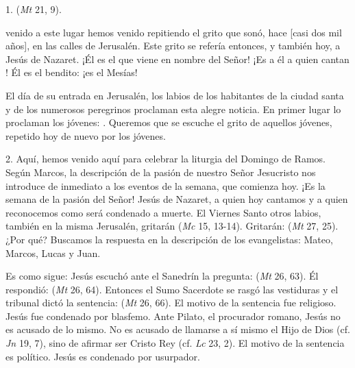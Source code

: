 \begin{body}
1.  (\textit{Mt} 21, 9).

 venido a este lugar  hemos venido repitiendo el grito que sonó, hace [casi dos mil años], en las calles de Jerusalén. Este grito se refería entonces, y también hoy, a Jesús de Nazaret. ¡Él es el que viene en nombre del Señor! ¡Es a él a quien cantan ! Él es el bendito: ¡es el Mesías!

El día de su entrada en Jerusalén, los labios de los habitantes de la ciudad santa y de los numerosos peregrinos proclaman esta alegre noticia. En primer lugar lo proclaman los jóvenes: . Queremos que se escuche el grito de aquellos jóvenes, repetido hoy de nuevo por los jóvenes. 

2. Aquí, hemos venido aquí para celebrar la liturgia del Domingo de Ramos. Según Marcos, la descripción de la pasión de nuestro Señor Jesucristo nos introduce de inmediato a los eventos de la semana, que comienza hoy. ¡Es la semana de la pasión del Señor! Jesús de Nazaret, a quien hoy cantamos  y a quien reconocemos como  será condenado a muerte. El Viernes Santo otros labios, también en la misma Jerusalén, gritarán  (\textit{Mc} 15, 13-14). Gritarán:  (\textit{Mt} 27, 25). ¿Por qué? Buscamos la respuesta en la descripción de los evangelistas: Mateo, Marcos, Lucas y Juan.

Es como sigue: Jesús escuchó ante el Sanedrín la pregunta:  (\textit{Mt} 26, 63). Él respondió:  (\textit{Mt} 26, 64). Entonces el Sumo Sacerdote se rasgó las vestiduras y el tribunal dictó la sentencia:  (\textit{Mt} 26, 66). El motivo de la sentencia fue religioso. Jesús fue condenado por blasfemo. Ante Pilato, el procurador romano, Jesús no es acusado de lo mismo. No es acusado de llamarse a sí mismo el Hijo de Dios (cf. \textit{Jn} 19, 7), sino de afirmar ser Cristo Rey (cf. \textit{Lc} 23, 2). El motivo de la sentencia es político. Jesús es condenado por usurpador.


\end{body}
